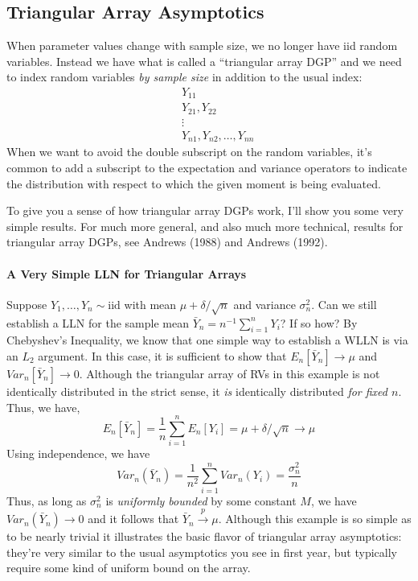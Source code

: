 \subsection{Triangular Array Asymptotics}
When parameter values change with sample size, we no longer have iid random variables. 
Instead we have what is called a ``triangular array DGP'' and we need to index random variables \emph{by sample size} in addition to the usual index:
\begin{eqnarray*}
&&Y_{11}\\
&&Y_{21}, Y_{22}\\
&& \vdots\\
&&Y_{n1}, Y_{n2}, \hdots, Y_{nn}
\end{eqnarray*}
When we want to avoid the double subscript on the random variables, it's common to add a subscript to the expectation and variance operators to indicate the distribution with respect to which the given moment is being evaluated.

To give you a sense of how triangular array DGPs work, I'll show you some very simple results. 
For much more general, and also much more technical, results for triangular array DGPs, see Andrews (1988) and Andrews (1992).

\paragraph{A Very Simple LLN for Triangular Arrays}
Suppose $Y_1, \hdots, Y_n \sim \mbox{iid}$ with mean $\mu + \delta/\sqrt{n}$ and variance $\sigma^2_n$. 
Can we still establish a LLN for the sample mean $\bar{Y}_n = n^{-1} \sum_{i=1}^n Y_i$? If so how? 
By Chebyshev's Inequality, we know that one simple way to establish a WLLN is via an $L_2$ argument.
In this case, it is sufficient to show that $E_n[\bar{Y}_n] \rightarrow \mu$ and $Var_n[\bar{Y}_n] \rightarrow 0$. 
Although the triangular array of RVs in this example is not identically distributed in the strict sense, it \emph{is} identically distributed \emph{for fixed $n$}. 
Thus, we have,
$$E_n[\bar{Y}_n] = \frac{1}{n} \sum_{i=1}^n E_n[Y_i] = \mu + \delta/\sqrt{n} \rightarrow \mu$$
Using independence, we have
$$Var_n(\bar{Y}_n) =\frac{1}{n^2} \sum_{i=1}^n Var_n(Y_i) = \frac{\sigma_n^2}{n}$$
Thus, as long as $\sigma_n^2$ is \emph{uniformly bounded} by some constant $M$, we have $Var_n(\bar{Y}_n) \rightarrow 0$ and it follows that $\bar{Y}_n \overset{p}{\rightarrow} \mu$. 
Although this example is so simple as to be nearly trivial it illustrates the basic flavor of triangular array asymptotics: they're very similar to the usual asymptotics you see in first year, but typically require some kind of uniform bound on the array.

